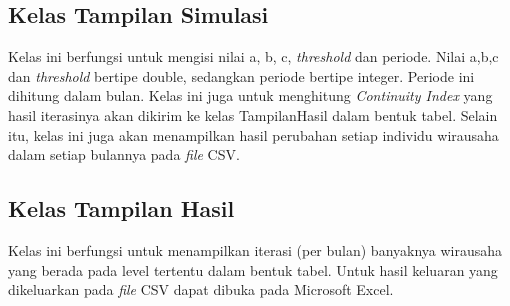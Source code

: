 \subsection{Kelas Tampilan Simulasi}
Kelas ini berfungsi untuk mengisi nilai a, b, c, \textit{threshold} dan periode. Nilai a,b,c dan \textit{threshold} bertipe double, sedangkan periode bertipe integer. Periode ini dihitung dalam bulan. Kelas ini juga untuk menghitung \textit{Continuity Index} yang hasil iterasinya akan dikirim ke kelas TampilanHasil dalam bentuk tabel. Selain itu, kelas ini juga akan menampilkan hasil perubahan setiap individu wirausaha dalam setiap bulannya pada \textit{file} CSV.

\subsection{Kelas Tampilan Hasil}
Kelas ini berfungsi untuk menampilkan iterasi (per bulan) banyaknya wirausaha yang berada pada level tertentu dalam bentuk tabel. Untuk hasil keluaran yang dikeluarkan pada \textit{file} CSV dapat dibuka pada Microsoft Excel.

